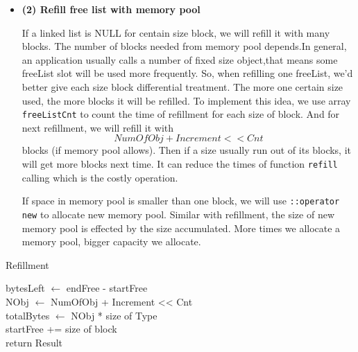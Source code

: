 \documentclass{article}
\begin{document}
\begin{itemize}
	\item{\textbf{(2) Refill free list with memory pool}}
	
	If a linked list is NULL for centain size block, we will refill it with many blocks. The number of blocks needed from memory pool depends.In general, an application usually calls a number of fixed size object,that means some freeList slot will be used more frequently. So, when refilling one freeList, we'd better give each size block differential treatment. The more one certain size used, the more blocks it will be refilled. To implement this idea, we use array \texttt{freeListCnt} to count the time of refillment for each size of block. And for next refillment, we will refill it with $$NumOfObj + Increment << Cnt$$ blocks (if memory pool allows). Then if a size usually run out of its blocks, it will get more blocks next time. It can reduce the times of function \texttt{refill} calling which is the costly operation.

	If space in memory pool is smaller than one block, we will use \texttt{::operator new} to allocate new memory pool. Similar with refillment, the size of new memory pool is effected by the size accumulated. More times we allocate a memory pool, bigger capacity we allocate.
	
\end{itemize}
\begin{center}
	\begin{algorithm}[H]
		\SetAlgoLined
		\caption{Refillment}
		bytesLeft $\leftarrow$ endFree - startFree\\
		NObj $\leftarrow$ NumOfObj + Increment << Cnt\\
		totalBytes $\leftarrow$ NObj * size of Type\\
		startFree += size of block\\
		return Result
	\end{algorithm} 
\end{center}
\end{document}

